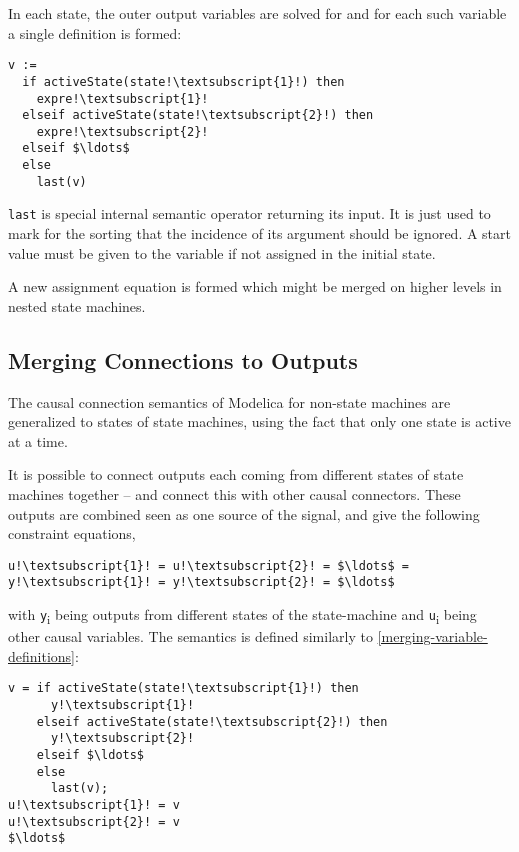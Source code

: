 In each state, the outer output variables are solved for and for each such variable a single definition is formed:
\begin{lstlisting}[language=modelica,escapechar=!]
v :=
  if activeState(state!\textsubscript{1}!) then
    expre!\textsubscript{1}!
  elseif activeState(state!\textsubscript{2}!) then
    expre!\textsubscript{2}!
  elseif $\ldots$
  else
    last(v)
\end{lstlisting}

\lstinline!last! is special internal semantic operator returning its input.
It is just used to mark for the sorting that the incidence of its argument should be ignored.
A start value must be given to the variable if not assigned in the initial state.

A new assignment equation is formed which might be merged on higher levels in nested state machines.

\subsection{Merging Connections to Outputs}\label{merging-connections-to-multiple-outputs}\label{merging-connections-to-outputs}

\begin{nonnormative}
The causal connection semantics of Modelica for non-state machines are generalized to states of state machines, using the fact that only one state is active at a time.
\end{nonnormative}

It is possible to connect outputs each coming from different states of state machines together -- and connect this with other causal connectors.
These outputs are combined seen as one source of the signal, and give the following constraint equations,
\begin{lstlisting}[language=modelica,escapechar=!]
u!\textsubscript{1}! = u!\textsubscript{2}! = $\ldots$ = y!\textsubscript{1}! = y!\textsubscript{2}! = $\ldots$
\end{lstlisting}
with \lstinline!y!\textsubscript{i} being outputs from different states of the state-machine and \lstinline!u!\textsubscript{i} being other causal variables.
The semantics is defined similarly to \cref{merging-variable-definitions}:
\begin{lstlisting}[language=modelica,escapechar=!]
v = if activeState(state!\textsubscript{1}!) then
      y!\textsubscript{1}!
    elseif activeState(state!\textsubscript{2}!) then
      y!\textsubscript{2}!
    elseif $\ldots$
    else
      last(v);
u!\textsubscript{1}! = v
u!\textsubscript{2}! = v
$\ldots$
\end{lstlisting}

